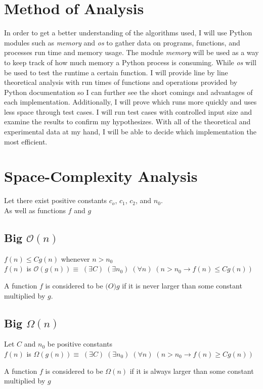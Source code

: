 \documentclass[a4paper]{article}
\newenvironment{definition}[1][Formal Definition]{\begin{trivlist}\item[\hskip \labelsep {\bfseries #1}]}{\end{trivlist}}
\newenvironment{indef}[1][Informal Definition]{\begin{trivlist}\item[\hskip \labelsep {\bfseries #1}]}{\end{trivlist}}
\begin{document}
\section{Method of Analysis}
In order to get a better understanding of the algorithms used, I will use Python modules such as \textit{memory} and \textit{os} \cite{WikiPython} to gather data on  programs, functions, and processes run time and memory usage. The module \textit{memory} will be used as a way to keep track of how much memory a Python process is consuming. While \textit{os} will be used to test the runtime a certain function. 
I will provide line by line theoretical analysis with run times of functions and operations provided by Python documentation so I can further see the short comings and advantages of each implementation. Additionally, I will prove which runs more quickly and uses less space through test cases. I will run test cases with controlled input size and examine the results to confirm my hypothesizes. With all of the theoretical and experimental data at my hand, I will be able to decide which implementation the most efficient.  

\section{Space-Complexity Analysis}
Let there exist positive constants $c_o$, $c_1$, $c_2$, and  $n_0$.\\ As well as functions $f$ and $g$
\subsection{Big $\mathcal{O}(n)$} 
\begin{definition} 
\leavevmode
$f(n) \leq Cg(n)$ whenever $n>n_0$\\
$f(n)$ is $ \mathcal{O}(g(n)) \equiv \; (\exists C) \; (\exists n_0) \; (\forall n) \;(n > n_0 \rightarrow f(n) \leq Cg(n))$
\cite{Auckland}
\end{definition}
\begin{indef}
A function $f$ is considered to be $\mathcal(O){g}$ if it is never larger than some constant multiplied by $g$.
\end{indef}

\subsection{Big $\Omega(n)$}
\begin{definition}Let $C$ and $n_0$ be positive constants  \\
$f(n)$ is $ \Omega(g(n)) \equiv \; (\exists C) \; (\exists n_0) \; (\forall n) \;(n > n_0 \rightarrow f(n) \geq Cg(n))$
\cite{Auckland}
\end{definition}
\begin{indef}
A function $f$ is considered to be $\Omega(n)$ if it is always larger than some constant multiplied by $g$	
\end{indef}
\end{document}
